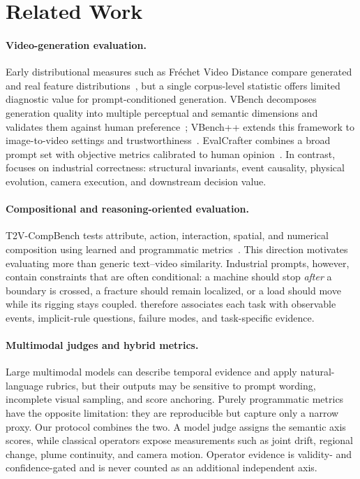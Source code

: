 \section{Related Work}
\label{sec:related}

\paragraph{Video-generation evaluation.}
Early distributional measures such as Fr\'echet Video Distance compare generated and real feature distributions~\cite{unterthiner2018fvd}, but a single corpus-level statistic offers limited diagnostic value for prompt-conditioned generation. VBench decomposes generation quality into multiple perceptual and semantic dimensions and validates them against human preference~\cite{huang2024vbench}; VBench++ extends this framework to image-to-video settings and trustworthiness~\cite{huang2025vbenchpp}. EvalCrafter combines a broad prompt set with objective metrics calibrated to human opinion~\cite{liu2023evalcrafter}. In contrast, \FORGE focuses on industrial correctness: structural invariants, event causality, physical evolution, camera execution, and downstream decision value.

\paragraph{Compositional and reasoning-oriented evaluation.}
T2V-CompBench tests attribute, action, interaction, spatial, and numerical composition using learned and programmatic metrics~\cite{sun2024t2vcompbench}. This direction motivates evaluating more than generic text--video similarity. Industrial prompts, however, contain constraints that are often conditional: a machine should stop \emph{after} a boundary is crossed, a fracture should remain localized, or a load should move while its rigging stays coupled. \FORGE therefore associates each task with observable events, implicit-rule questions, failure modes, and task-specific evidence.

\paragraph{Multimodal judges and hybrid metrics.}
Large multimodal models can describe temporal evidence and apply natural-language rubrics, but their outputs may be sensitive to prompt wording, incomplete visual sampling, and score anchoring. Purely programmatic metrics have the opposite limitation: they are reproducible but capture only a narrow proxy. Our protocol combines the two. A model judge assigns the semantic axis scores, while classical operators expose measurements such as joint drift, regional change, plume continuity, and camera motion. Operator evidence is validity- and confidence-gated and is never counted as an additional independent axis.

